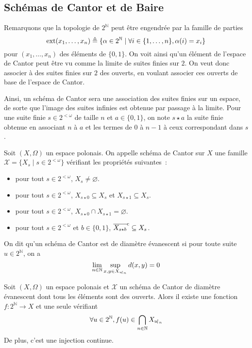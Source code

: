 \subsection{Schémas de Cantor et de Baire}

Remarquons que la topologie de $2^{\mathbb N}$ peut être engendrée par la famille
de parties
\[\operatorname{ext}(x_1,\ldots,x_n) \triangleq
\{\alpha \in 2^{\mathbb N}\mid \forall i \in \{1,\ldots,n\}, \alpha(i) = x_i\}\]
pour $(x_1,\ldots,x_n)$ des éléments de $\{0,1\}$. On voit ainsi qu'un élément
de l'espace de Cantor peut être vu comme la limite de suites finies sur $2$.
On veut donc associer à des suites finies sur $2$ des ouverts, en voulant
associer ces ouverts de base de l'espace de Cantor.

Ainsi, un schéma de Cantor sera une association des suites finies sur un espace,
de sorte que l'image des suites infinies est obtenue par passage à la limite.
Pour une suite finie $s \in 2^{<\omega}$ de taille $n$ et $a \in \{0,1\}$, on
note $s\star a$ la suite finie obtenue en associant $n$ à $a$ et les termes
de $0$ à $n-1$ à ceux correspondant dans $s$.

\begin{definition}
  Soit $(X,\Omega)$ un espace polonais. On appelle schéma de Cantor sur $X$ une
  famille $\mathcal X = \{X_s\mid s \in 2^{<\omega}\}$ vérifiant les propriétés
  suivantes~:
  \begin{itemize}
  \item pour tout $s \in 2^{<\omega}$, $X_s \neq \varnothing$.
  \item pour tout $s\in 2^{<\omega}$, $X_{s\star 0} \subseteq X_s$ et
    $X_{s\star 1} \subseteq X_s$.
  \item pour tout $s\in 2^{<\omega}$,
    $X_{s\star 0}\cap X_{s\star 1} = \varnothing$.
  \item pour tout $s \in 2^{<\omega}$ et $b \in \{0,1\}$,
    $\overline{X_{s\star b}}^{\mathrm c}\subseteq X_s$.
  \end{itemize}

  On dit qu'un schéma de Cantor est de diamètre évanescent si pour toute suite
  $u\in 2^{\mathbb N}$, on a
  \[\lim_{n\in\mathbb N} \sup_{x,y\in X_{u\!\upharpoonright_{n}}}d(x,y) = 0\]
\end{definition}

\begin{proposition}\label{desc.prop.schem.C}
  Soit $(X,\Omega)$ un espace polonais et $\mathcal X$ un schéma de Cantor de
  diamètre évanescent dont tous les éléments sont des ouverts. Alors il existe
  une fonction $f : 2^{\mathbb N} \to X$ et une seule vérifiant
  \[\forall u \in 2^{\mathbb N}, f(u) \in \bigcap_{n \in \mathbb N}X_{u\!\upharpoonright_{n}}\]
  De plus, c'est une injection continue.
\end{proposition}


